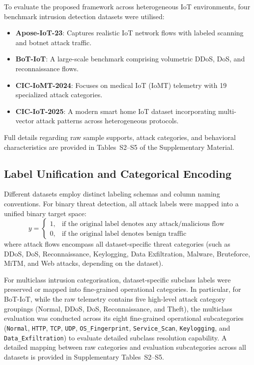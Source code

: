\documentclass[a4paper,fleqn]{cas-sc}
\begin{document}
To evaluate the proposed framework across heterogeneous IoT environments, four benchmark intrusion detection datasets were utilised:
\begin{itemize}
    \item \textbf{Apose-IoT-23}: Captures realistic IoT network flows with labeled scanning and botnet attack traffic.
    \item \textbf{BoT-IoT}: A large-scale benchmark comprising volumetric DDoS, DoS, and reconnaissance flows.
    \item \textbf{CIC-IoMT-2024}: Focuses on medical IoT (IoMT) telemetry with 19 specialized attack categories.
    \item \textbf{CIC-IoT-2025}: A modern smart home IoT dataset incorporating multi-vector attack patterns across heterogeneous protocols.
\end{itemize}
Full details regarding raw sample supports, attack categories, and behavioral characteristics are provided in Tables~S2--S5 of the Supplementary Material.

\subsection{Label Unification and Categorical Encoding}

Different datasets employ distinct labeling schemas and column naming conventions. For binary threat detection, all attack labels were mapped into a unified binary target space:
\begin{equation}
y =
\begin{cases}
1, & \text{if the original label denotes any attack/malicious flow} \\
0, & \text{if the original label denotes benign traffic}
\end{cases}
\end{equation}
where attack flows encompass all dataset-specific threat categories (such as DDoS, DoS, Reconnaissance, Keylogging, Data Exfiltration, Malware, Bruteforce, MiTM, and Web attacks, depending on the dataset).

For multiclass intrusion categorisation, dataset-specific subclass labels were preserved or mapped into fine-grained operational categories. In particular, for BoT-IoT, while the raw telemetry contains five high-level attack category groupings (Normal, DDoS, DoS, Reconnaissance, and Theft), the multiclass evaluation was conducted across its eight fine-grained operational subcategories (\texttt{Normal}, \texttt{HTTP}, \texttt{TCP}, \texttt{UDP}, \texttt{OS\_Fingerprint}, \texttt{Service\_Scan}, \texttt{Keylogging}, and \texttt{Data\_Exfiltration}) to evaluate detailed subclass resolution capability. A detailed mapping between raw categories and evaluation subcategories across all datasets is provided in Supplementary Tables~S2--S5.
\end{document}

